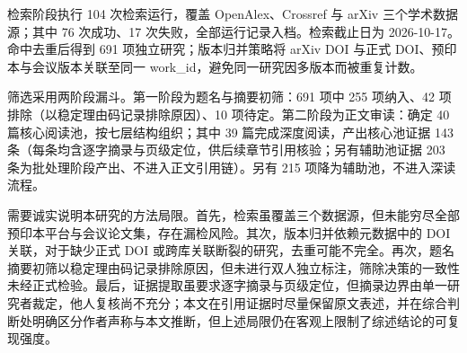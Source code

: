 检索阶段执行 104 次检索运行，覆盖 OpenAlex、Crossref 与 arXiv 三个学术数据源；其中 76 次成功、17 次失败，全部运行记录入档。检索截止日为 2026-10-17。命中去重后得到 691 项独立研究；版本归并策略将 arXiv DOI 与正式 DOI、预印本与会议版本关联至同一 work\_id，避免同一研究因多版本而被重复计数。

筛选采用两阶段漏斗。第一阶段为题名与摘要初筛：691 项中 255 项纳入、42 项排除（以稳定理由码记录排除原因）、10 项待定。第二阶段为正文审读：确定 40 篇核心阅读池，按七层结构组织；其中 39 篇完成深度阅读，产出核心池证据 143 条（每条均含逐字摘录与页级定位，供后续章节引用核验；另有辅助池证据 203 条为批处理阶段产出、不进入正文引用链）。另有 215 项降为辅助池，不进入深读流程。

需要诚实说明本研究的方法局限。首先，检索虽覆盖三个数据源，但未能穷尽全部预印本平台与会议论文集，存在漏检风险。其次，版本归并依赖元数据中的 DOI 关联，对于缺少正式 DOI 或跨库关联断裂的研究，去重可能不完全。再次，题名摘要初筛以稳定理由码记录排除原因，但未进行双人独立标注，筛除决策的一致性未经正式检验。最后，证据提取虽要求逐字摘录与页级定位，但摘录边界由单一研究者裁定，他人复核尚不充分；本文在引用证据时尽量保留原文表述，并在综合判断处明确区分作者声称与本文推断，但上述局限仍在客观上限制了综述结论的可复现强度。


